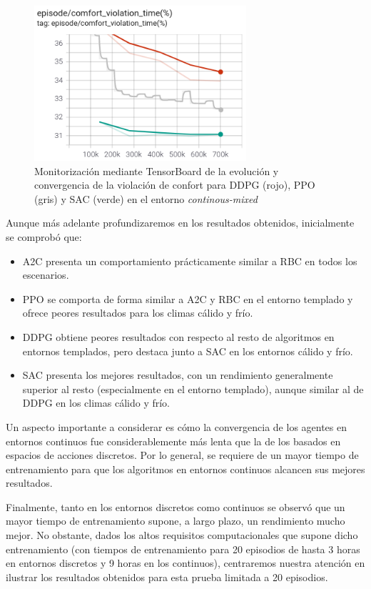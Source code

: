 \begin{figure}
    \centering
    \includegraphics[width=0.7\textwidth]{imagenes/train-cont-confort-violation.png}
    \caption{Monitorización mediante TensorBoard de la evolución y convergencia de la violación de confort para DDPG (rojo), PPO (gris) y SAC (verde) en el entorno \textit{continous-mixed}}
    \label{fig:train-cont-confort}
\end{figure}

Aunque más adelante profundizaremos en los resultados obtenidos, inicialmente se comprobó que:

\begin{itemize}
    \item A2C presenta un comportamiento prácticamente similar a RBC en todos los escenarios.
    \item PPO se comporta de forma similar a A2C y RBC en el entorno templado y ofrece peores resultados para los climas cálido y frío.
    \item DDPG obtiene peores resultados con respecto al resto de algoritmos en entornos templados, pero destaca junto a SAC en los entornos cálido y frío.
    \item SAC presenta los mejores resultados, con un rendimiento generalmente superior al resto (especialmente en el entorno templado), aunque similar al de DDPG en los climas cálido y frío.
\end{itemize}

Un aspecto importante a considerar es cómo la convergencia de los agentes en entornos continuos fue considerablemente más lenta que la de los basados en espacios de acciones discretos. Por lo general, se requiere de un mayor tiempo de entrenamiento para que los algoritmos en entornos continuos alcancen sus mejores resultados.

Finalmente, tanto en los entornos discretos como continuos se observó que un mayor tiempo de entrenamiento supone, a largo plazo, un rendimiento mucho mejor. No obstante, dados los altos requisitos computacionales que supone dicho entrenamiento (con tiempos de entrenamiento para 20 episodios de hasta 3 horas en entornos discretos y 9 horas en los continuos), centraremos nuestra atención en ilustrar los resultados obtenidos para esta prueba limitada a 20 episodios.

